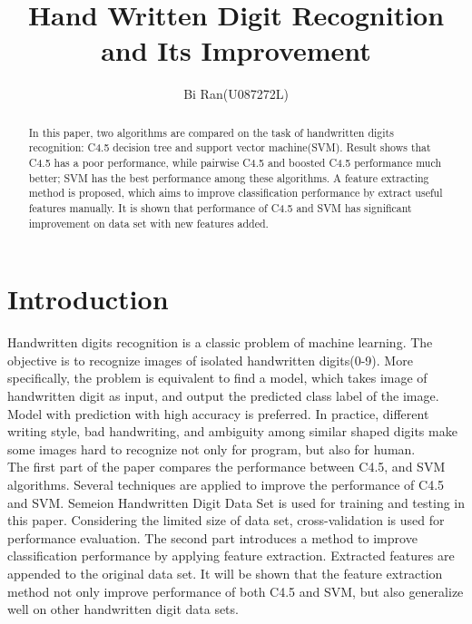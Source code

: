 \documentclass[a4paper,11pt]{article}
\author{Bi Ran(U087272L)}
\title{Hand Written Digit Recognition and Its Improvement}
\begin{document}
\maketitle
\begin{abstract}
In this paper, two algorithms are compared on the task of handwritten digits recognition: C4.5 decision tree and support vector machine(SVM). Result shows that C4.5 has a poor performance, while pairwise C4.5 and boosted C4.5 performance much better; SVM has the best performance among these algorithms. A feature extracting method is proposed, which aims to improve classification performance by extract useful features manually. It is shown that performance of C4.5 and SVM has significant improvement on data set with new features added.
\end{abstract}
\section{Introduction}
 Handwritten digits recognition is a classic problem of machine learning. The objective is to recognize images of isolated handwritten digits(0-9). More specifically, the problem is equivalent to find a model, which takes image of handwritten digit as input, and output the predicted class label of the image. Model with prediction with high accuracy is preferred. In practice, different writing style, bad handwriting, and ambiguity among similar shaped digits make some images hard to recognize not only for program, but also for human.\\
 The first part of the paper compares the performance between C4.5, and SVM algorithms. Several techniques are applied to improve the performance of C4.5 and SVM. Semeion Handwritten Digit Data Set is used for training and testing in this paper. Considering the limited size of data set, cross-validation is used for performance evaluation. The second part introduces a method to improve classification performance by applying feature extraction. Extracted features are appended to the original data set. It will be shown that the feature extraction method not only improve performance of both C4.5 and SVM, but also generalize well on other handwritten digit data sets.
\end{document}
